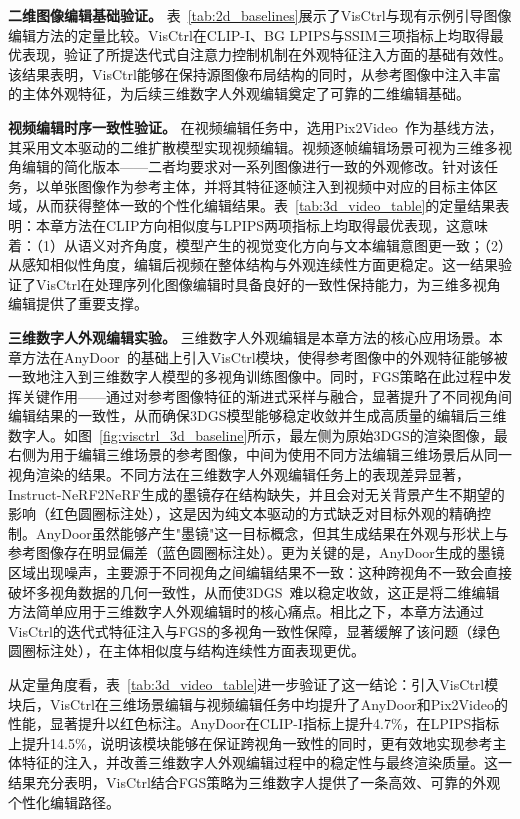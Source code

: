 

\textbf{二维图像编辑基础验证。} 表~\ref{tab:2d_baselines}展示了VisCtrl与现有示例引导图像编辑方法的定量比较。VisCtrl在CLIP-I、BG LPIPS与SSIM三项指标上均取得最优表现，验证了所提迭代式自注意力控制机制在外观特征注入方面的基础有效性。该结果表明，VisCtrl能够在保持源图像布局结构的同时，从参考图像中注入丰富的主体外观特征，为后续三维数字人外观编辑奠定了可靠的二维编辑基础。

\textbf{视频编辑时序一致性验证。} 在视频编辑任务中，选用Pix2Video~\cite{ceylan2023pix2video}作为基线方法，其采用文本驱动的二维扩散模型实现视频编辑。视频逐帧编辑场景可视为三维多视角编辑的简化版本——二者均要求对一系列图像进行一致的外观修改。针对该任务，以单张图像作为参考主体，并将其特征逐帧注入到视频中对应的目标主体区域，从而获得整体一致的个性化编辑结果。表~\ref{tab:3d_video_table}的定量结果表明：本章方法在CLIP方向相似度与LPIPS两项指标上均取得最优表现，这意味着：（1）从语义对齐角度，模型产生的视觉变化方向与文本编辑意图更一致；（2）从感知相似性角度，编辑后视频在整体结构与外观连续性方面更稳定。这一结果验证了VisCtrl在处理序列化图像编辑时具备良好的一致性保持能力，为三维多视角编辑提供了重要支撑。

\textbf{三维数字人外观编辑实验。} 三维数字人外观编辑是本章方法的核心应用场景。本章方法在AnyDoor~\cite{chen2023anydoor}的基础上引入VisCtrl模块，使得参考图像中的外观特征能够被一致地注入到三维数字人模型的多视角训练图像中。同时，FGS策略在此过程中发挥关键作用——通过对参考图像特征的渐进式采样与融合，显著提升了不同视角间编辑结果的一致性，从而确保3DGS模型能够稳定收敛并生成高质量的编辑后三维数字人。如图~\ref{fig:visctrl_3d_baseline}所示，最左侧为原始3DGS的渲染图像，最右侧为用于编辑三维场景的参考图像，中间为使用不同方法编辑三维场景后从同一视角渲染的结果。不同方法在三维数字人外观编辑任务上的表现差异显著，Instruct-NeRF2NeRF生成的墨镜存在结构缺失，并且会对无关背景产生不期望的影响（红色圆圈标注处），这是因为纯文本驱动的方式缺乏对目标外观的精确控制。AnyDoor虽然能够产生"墨镜"这一目标概念，但其生成结果在外观与形状上与参考图像存在明显偏差（蓝色圆圈标注处）。更为关键的是，AnyDoor生成的墨镜区域出现噪声，主要源于不同视角之间编辑结果不一致：这种跨视角不一致会直接破坏多视角数据的几何一致性，从而使3DGS~\cite{kerbl3Dgaussians}难以稳定收敛，这正是将二维编辑方法简单应用于三维数字人外观编辑时的核心痛点。相比之下，本章方法通过VisCtrl的迭代式特征注入与FGS的多视角一致性保障，显著缓解了该问题（绿色圆圈标注处），在主体相似度与结构连续性方面表现更优。

从定量角度看，表~\ref{tab:3d_video_table}进一步验证了这一结论：引入VisCtrl模块后，VisCtrl在三维场景编辑与视频编辑任务中均提升了AnyDoor和Pix2Video的性能，显著提升以红色标注。AnyDoor在CLIP-I指标上提升4.7\%，在LPIPS指标上提升14.5\%，说明该模块能够在保证跨视角一致性的同时，更有效地实现参考主体特征的注入，并改善三维数字人外观编辑过程中的稳定性与最终渲染质量。这一结果充分表明，VisCtrl结合FGS策略为三维数字人提供了一条高效、可靠的外观个性化编辑路径。

